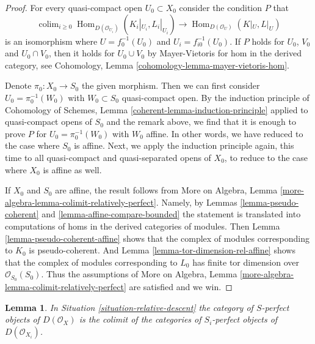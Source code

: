 \documentclass{stacks-project}
\theoremstyle{plain}
\newtheorem{lemma}[subsection]{Lemma}
\theoremstyle{definition}
\theoremstyle{remark}
\numberwithin{equation}{subsection}
\def\colim{\mathop{\mathrm{colim}}\nolimits}
\def\Hom{\mathop{\mathrm{Hom}}\nolimits}
\begin{document}
\begin{proof}
For every quasi-compact open $U_0 \subset X_0$ consider the
condition $P$ that
$$
\colim_{i \geq 0} \Hom_{D(\mathcal{O}_{U_i})}(K_i|_{U_i}, L_i|_{U_i})
\longrightarrow
\Hom_{D(\mathcal{O}_U)}(K|_U, L|_U)
$$
is an isomorphism where $U = f_0^{-1}(U_0)$ and $U_i = f_{i0}^{-1}(U_0)$.
If $P$ holds for $U_0$, $V_0$ and $U_0 \cap V_0$, then it holds
for $U_0 \cup V_0$ by Mayer-Vietoris
for hom in the derived category, see
Cohomology, Lemma \ref{cohomology-lemma-mayer-vietoris-hom}.

\medskip\noindent
Denote $\pi_0 : X_0 \to S_0$ the given morphism.
Then we can first consider $U_0 = \pi_0^{-1}(W_0)$ with
$W_0 \subset S_0$ quasi-compact open. By the induction principle of
Cohomology of Schemes, Lemma \ref{coherent-lemma-induction-principle}
applied to quasi-compact opens of $S_0$
and the remark above, we find that it is enough to prove
$P$ for $U_0 = \pi_0^{-1}(W_0)$ with $W_0$ affine.
In other words, we have reduced to the case where $S_0$ is affine.
Next, we apply the induction principle again, this time to all
quasi-compact and quasi-separated opens of $X_0$, to reduce to the
case where $X_0$ is affine as well.

\medskip\noindent
If $X_0$ and $S_0$ are affine, the result follows from
More on Algebra, Lemma \ref{more-algebra-lemma-colimit-relatively-perfect}.
Namely, by Lemmas \ref{lemma-pseudo-coherent} and
\ref{lemma-affine-compare-bounded}
the statement is translated into computations of homs in the
derived categories of modules. Then
Lemma \ref{lemma-pseudo-coherent-affine}
shows that the complex of modules corresponding to $K_0$
is pseudo-coherent. And
Lemma \ref{lemma-tor-dimension-rel-affine}
shows that the complex of modules corresponding to $L_0$
has finite tor dimension over $\mathcal{O}_{S_0}(S_0)$.
Thus the assumptions of
More on Algebra, Lemma \ref{more-algebra-lemma-colimit-relatively-perfect}
are satisfied and we win.
\end{proof}

\begin{lemma}
\label{lemma-descend-relatively-perfect}
In Situation \ref{situation-relative-descent} the category of
$S$-perfect objects of $D(\mathcal{O}_X)$ is the colimit of the categories
of $S_i$-perfect objects of $D(\mathcal{O}_{X_i})$.
\end{lemma}
\end{document}
